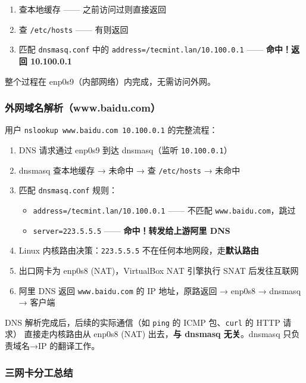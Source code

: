 \documentclass[12pt,a4paper]{ctexart}
\begin{document}
\begin{enumerate}[label=(\arabic*),leftmargin=*]
  \item 查本地缓存 —— 之前访问过则直接返回
  \item 查 \texttt{/etc/hosts} —— 有则返回
  \item 匹配 \texttt{dnsmasq.conf} 中的 \texttt{address=/tecmint.lan/10.100.0.1} —— \textbf{命中！返回 10.100.0.1}
\end{enumerate}

整个过程在 enp0s9（内部网络）内完成，无需访问外网。

\subsubsection{外网域名解析（www.baidu.com）}

用户 \texttt{nslookup www.baidu.com 10.100.0.1} 的完整流程：

\begin{enumerate}[label=(\arabic*),leftmargin=*]
  \item DNS 请求通过 enp0s9 到达 dnsmasq（监听 \texttt{10.100.0.1}）
  \item dnsmasq 查本地缓存 → 未命中 → 查 \texttt{/etc/hosts} → 未命中
  \item 匹配 \texttt{dnsmasq.conf} 规则：
  \begin{itemize}
    \item \texttt{address=/tecmint.lan/10.100.0.1} —— 不匹配 \texttt{www.baidu.com}，跳过
    \item \texttt{server=223.5.5.5} —— \textbf{命中！转发给上游阿里 DNS}
  \end{itemize}
  \item Linux 内核路由决策：\texttt{223.5.5.5} 不在任何本地网段，走\textbf{默认路由}
  \item 出口网卡为 enp0s8 (NAT)，VirtualBox NAT 引擎执行 SNAT 后发往互联网
  \item 阿里 DNS 返回 \texttt{www.baidu.com} 的 IP 地址，原路返回 → enp0s8 → dnsmasq → 客户端
\end{enumerate}

\begin{infobox}
  DNS 解析完成后，后续的实际通信（如 \texttt{ping} 的 ICMP 包、\texttt{curl} 的 HTTP 请求）
  直接走内核路由从 enp0s8 (NAT) 出去，\textbf{与 dnsmasq 无关}。dnsmasq 只负责域名→IP 的翻译工作。
\end{infobox}

\subsubsection{三网卡分工总结}
\end{document}

